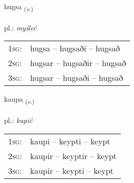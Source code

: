 \documentclass[frontgrid, backgrid]{flacards}\usepackage[]{graphicx}\usepackage[]{xcolor}
\begin{document}
\renewcommand{\blhead}{\vskip5pt {\small\bfseries\footnotesize Sagnorð | czasownik }}
\renewcommand{\bcfoot}{\vskip5pt \hspace{2pt}{\small\bfseries\footnotesize 1K}}


{hugsa \small{\textsubscript{(\textit{v.})}} \\[1ex] %
\textphonetic{[hʏksa]} \\
pl.: \emph{myśleć} \\  [2ex]
\renewcommand*{\arraystretch}{0.8}
\begin{tabular}{p{1cm}l}
\textsc{1sg}: & hugsa -- hugsaði -- hugsað \\ 
\textsc{2sg}: & hugsar -- hugsaðir -- hugsað \\ 
\textsc{3sg}: & hugsar -- hugsaði -- hugsað \\ 
\end{tabular}
}

\renewcommand{\flhead}{\vskip5pt \fboxsep=0pt {\small\bfseries\footnotesize Sagnorð | czasownik}}
\renewcommand{\fcfoot}{\vskip5pt \fboxsep=0pt \hspace{2pt}{\small\bfseries\footnotesize 1K}}

\renewcommand{\blhead}{\vskip5pt {\small\bfseries\footnotesize Sagnorð | czasownik }}
\renewcommand{\bcfoot}{\vskip5pt \hspace{2pt}{\small\bfseries\footnotesize 1K}}


{kaupa \small{\textsubscript{(\textit{v.})}} \\[1ex] %
\textphonetic{[kʰœiːpa]} \\
pl.: \emph{kupić} \\  [2ex]
\renewcommand*{\arraystretch}{0.8}
\begin{tabular}{p{1cm}l}
\textsc{1sg}: & kaupi -- keypti -- keypt \\ 
\textsc{2sg}: & kaupir -- keyptir -- keypt \\ 
\textsc{3sg}: & kaupir -- keypti -- keypt \\ 
\end{tabular}
}
\end{document}
